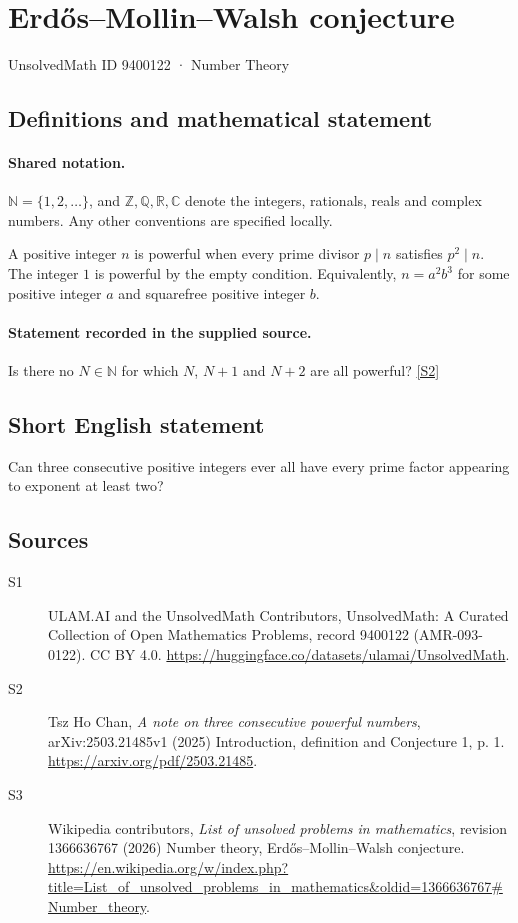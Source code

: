 \documentclass[11pt]{article}
\newcommand{\sref}[2]{\hyperlink{source:#1:#2}{[S#2]}}
\begin{document}
\setcounter{section}{9400121}
\section{Erdős–Mollin–Walsh conjecture}\label{9400122}
{\small\sffamily UnsolvedMath ID 9400122 · Number Theory}
\subsection{Definitions and mathematical statement}

\paragraph{Shared notation.}$\mathbb N=\{1,2,\ldots\}$, and $\mathbb Z,\mathbb Q,\mathbb R,\mathbb C$ denote the integers, rationals, reals and complex numbers. Any other conventions are specified locally.


A positive integer $n$ is powerful when every prime divisor $p\mid n$ satisfies $p^2\mid n$. The integer $1$ is powerful by the empty condition. Equivalently, $n=a^2b^3$ for some positive integer $a$ and squarefree positive integer $b$.
\paragraph{Statement recorded in the supplied source.}
Is there no $N\in\mathbb N$ for which $N$, $N+1$ and $N+2$ are all powerful? \sref{9400122}{2}
\subsection{Short English statement}
Can three consecutive positive integers ever all have every prime factor appearing to exponent at least two?
\subsection{Sources}
\begin{description}
\item[\hypertarget{source:9400122:1}{S1}] ULAM.AI and the UnsolvedMath Contributors, UnsolvedMath: A Curated Collection of Open Mathematics Problems, record 9400122 (AMR-093-0122). CC BY 4.0. \url{https://huggingface.co/datasets/ulamai/UnsolvedMath}.
\item[\hypertarget{source:9400122:2}{S2}] Tsz Ho Chan, \emph{A note on three consecutive powerful numbers}, arXiv:2503.21485v1 (2025) Introduction, definition and Conjecture 1, p. 1. \url{https://arxiv.org/pdf/2503.21485}.
\item[\hypertarget{source:9400122:3}{S3}] Wikipedia contributors, \emph{List of unsolved problems in mathematics}, revision 1366636767 (2026) Number theory, Erdős–Mollin–Walsh conjecture. \url{https://en.wikipedia.org/w/index.php?title=List_of_unsolved_problems_in_mathematics&oldid=1366636767#Number_theory}.
\end{description}
\label{end:9400122}
\end{document}
